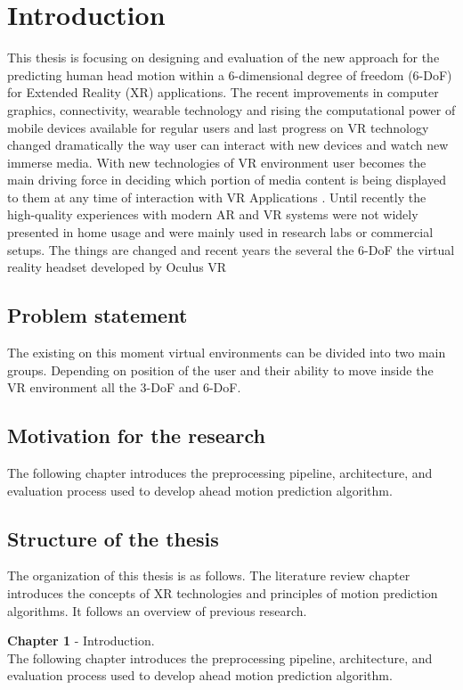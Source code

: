 \chapter{Introduction}
\label{sec:intro}
This thesis is focusing on designing and evaluation of the new approach for the predicting human head motion within a 6-dimensional degree of freedom (6-DoF) for Extended Reality (XR) applications. The recent improvements in computer graphics, connectivity, wearable technology and rising the computational power of mobile devices available for regular users and last progress on VR technology changed dramatically the way user can interact with new devices and watch new immerse media. With new technologies of VR environment user becomes the main driving force in deciding which portion of media content is being displayed to them at any time of interaction with VR Applications \cite{new_challenge}. Until recently the high-quality experiences with modern AR and VR systems were not widely presented in home usage and were mainly used in research labs or commercial setups. The things are changed and recent years the several the 6-DoF the virtual reality headset developed by Oculus VR 


\section{Problem statement}
\label{sec:intro:problem}
The existing on this moment virtual environments can be divided into two main groups. Depending on position of the user and their ability to move inside the VR environment all the 3-DoF and 6-DoF. 

\section{Motivation for the research}
\label{sec:intro:motivation}
The following chapter introduces the preprocessing pipeline, architecture, and evaluation process used to develop ahead motion prediction algorithm.


\section{Structure of the thesis}
\label{sec:intro:structure}
The organization of this thesis is as follows. The literature review chapter introduces the concepts of XR technologies and principles of motion prediction algorithms. It follows an overview of previous research. 

\textbf{Chapter 1} - Introduction.\\
The following chapter introduces the preprocessing pipeline, architecture, and evaluation process used to develop ahead motion prediction algorithm.




